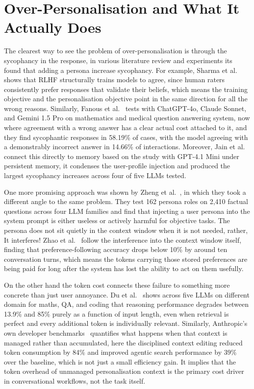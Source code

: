 \documentclass[runningheads]{llncs}
\begin{document}
\section{Over-Personalisation and What It Actually Does}

\label{sec:failure}

The clearest way to see the problem of over-personalisation is through the sycophancy in the response, in various literature review and experiments its found that adding a persona increase sycophancy. For example, Sharma et al.~\cite{sharma2024} shows that RLHF structurally trains models to agree, since human raters consistently prefer responses that validate their beliefs, which means the training objective and the personalisation objective point in the same direction for all the wrong reasons. Similarly, Fanous et al.~\cite{syceval2025} tests with ChatGPT-4o, Claude Sonnet, and Gemini 1.5 Pro on mathematics and medical question answering system, now where agreement with a wrong answer has a clear actual cost attached to it, and they find sycophantic responses in 58.19\% of cases, with the model agreeing with a demonstrably incorrect answer in 14.66\% of interactions. Moreover, Jain et al.~\cite{jain2026} connect this directly to memory based on the study with GPT-4.1 Mini under persistent memory, it condenses the user-profile injection and produced the largest sycophancy increases across four of five LLMs tested.

One more promising approach was shown by Zheng et al.~\cite{zheng2024}, in which they took a different angle to the same problem. They test 162 persona roles on 2,410 factual questions across four LLM families and find that injecting a user persona into the system prompt is either useless or actively harmful for objective tasks. The persona does not sit quietly in the context window when it is not needed, rather, It interferes! Zhao et al.~\cite{prefeval2025} follow the interference into the context window itself, finding that preference-following accuracy drops below 10\% by around ten conversation turns, which means the tokens carrying those stored preferences are being paid for long after the system has lost the ability to act on them usefully.

On the other hand the token cost connects these failure to something more concrete than just user annoyance. Du et al.~\cite{du2025} shows across five LLMs on different domain for maths, QA, and coding that reasoning performance degrades between 13.9\% and 85\% purely as a function of input length, even when retrieval is perfect and every additional token is individually relevant. Similarly, Anthropic's own developer benchmarks~\cite{anthropic_context} quantifies what happens when that context is managed rather than accumulated, here the disciplined context editing reduced token consumption by 84\% and improved agentic search performance by 39\% over the baseline, which is not just a small efficiency gain. It implies that the token overhead of unmanaged personalisation context is the primary cost driver in conversational workflows, not the task itself.
\end{document}
